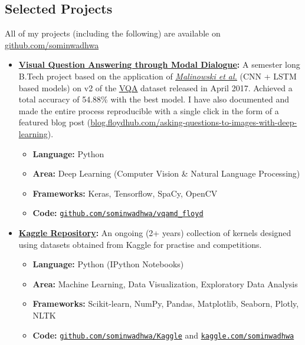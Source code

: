 \documentclass[margin,line]{res}
\begin{document}
\begin{resume}
\section{\sc Selected Projects}
All of my projects (including the following) are available on {\href{https://github.com/sominwadhwa}{github.com/sominwadhwa}}\\
\begin{itemize}[leftmargin=*]
\item {\bf {\href{https://github.com/sominwadhwa/vqamd_floyd}{Visual Question Answering through Modal Dialogue}:}}
A semester long B.Tech project based on the application of \textit{\href{https://arxiv.org/pdf/1505.01121.pdf}{\underline{Malinowski et al.}}} (CNN + LSTM based models) on v2 of the {\href{http://visualqa.org/}{\underline{VQA}}} dataset released in April 2017. Achieved a total accuracy of 54.88\% with the best model. I have also documented and made the entire process reproducible with a single click in the form of a featured blog post (\href{https://blog.floydhub.com/asking-questions-to-images-with-deep-learning/}{blog.floydhub.com/asking-questions-to-images-with-deep-learning}).
\begin{itemize}[leftmargin=*]
\item {\bf Language:} Python
\item {\bf Area:} Deep Learning (Computer Vision \& Natural Language Processing)
\item {\bf Frameworks:} Keras, Tensorflow, SpaCy, OpenCV
\item {\bf Code:} {\href{https://github.com/sominwadhwa/vqamd_floyd}{\texttt{github.com/sominwadhwa/vqamd\_floyd}}}
\end{itemize}
\item {\bf {\href{https://github.com/sominwadhwa/Kaggle}{Kaggle Repository}:}}
An ongoing (2+ years) collection of kernels designed using datasets obtained from Kaggle for practise and competitions.
\begin{itemize}[leftmargin=*]
\item {\bf Language:} Python (IPython Notebooks)
\item {\bf Area:} Machine Learning, Data Visualization, Exploratory Data Analysis
\item {\bf Frameworks:} Scikit-learn, NumPy, Pandas, Matplotlib, Seaborn, Plotly, NLTK 
\item {\bf Code:} {\href{https://github.com/sominwadhwa/Kaggle}{\texttt{github.com/sominwadhwa/Kaggle}}} and {\href{https://www.kaggle.com/sominwadhwa}{\texttt{kaggle.com/sominwadhwa}}}

\end{itemize}
\end{itemize}
\end{resume}
\end{document}
